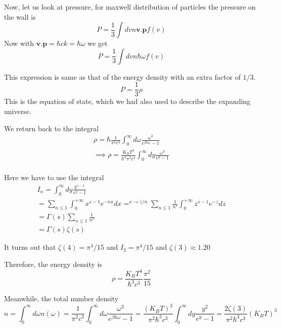 \documentclass[12pt]{report}
\newcommand{\mbf}[1]{\mathbf{#1}}
\begin{document}
Now, let us look at pressure,
for maxwell distribution of particles the pressure on the wall is 
\begin{equation}
P=\frac{1}{3} \int dv n \mbf{v.p}f(v)
\end{equation}
Now with $\mbf{v.p}=\hbar ck=\hbar\omega$ we get
\begin{equation}
P=\frac{1}{3} \int dv n \hbar\omega f(v)
\end{equation}

This expression is same as that of the energy density with an extra factor of $1/3$.
\begin{equation}
P=\frac{1}{3}\rho
\end{equation}
This is the equation of state, which we had also used to describe the expanding universe.

We return back to the integral
\begin{eqnarray*}
\rho = \hbar  \frac{1}{\pi^2 c^3} \int^\infty_0 d\omega \frac{\omega^3}{e^{\beta \hbar \omega}-1}\\
\implies \rho =   \frac{K_BT^4}{\hbar^3 \pi^2 c^3} \int^\infty_0 dy \frac{\omega^3}{e^y-1}\\
\end{eqnarray*}

Here we have to use the integral
\begin{eqnarray*}
I_n=\int^\infty_0 dy \frac{y^{s-1}}{e^y-1}\\
=\sum_{n\leq 1} \int^{+\infty}_0 x^{s-1} e^{-nx} dx
=^{x \rightarrow z/n} \sum_{n\leq 1} \frac{1}{n^s} \int^{+\infty}_0 z^{s-1} e^{-z} dz\\
=\Gamma(s) \sum_{n \leq 1} \frac{1}{n^s}\\
=\Gamma(s) \zeta(s)
\end{eqnarray*}

It turns out that $\zeta(4)= \pi^4/15$ and $I_3=\pi^4/15$ and $\zeta(3) \approx 1.20$

Therefore, the energy density is 
\begin{equation}
\rho = \frac{K_BT^4}{\hbar^3  c^3} \frac{\pi^2}{15}
\end{equation}

Meanwhile, the total number density
\begin{equation}
n=\int^\infty_0 d\omega n(\omega)=\frac{1}{\pi^2 c^3} \int^\infty_0 d\omega \frac{\omega^2}{e^{\beta \hbar \omega}-1} = \frac{(K_BT)^3}{\pi^2 \hbar^3 c^3} \int^\infty_0 dy \frac{y^2}{e^y-1}=\frac{2 \zeta(3)}{\pi^2 \hbar^3 c^3}(K_BT)^3
\end{equation}
\end{document}
